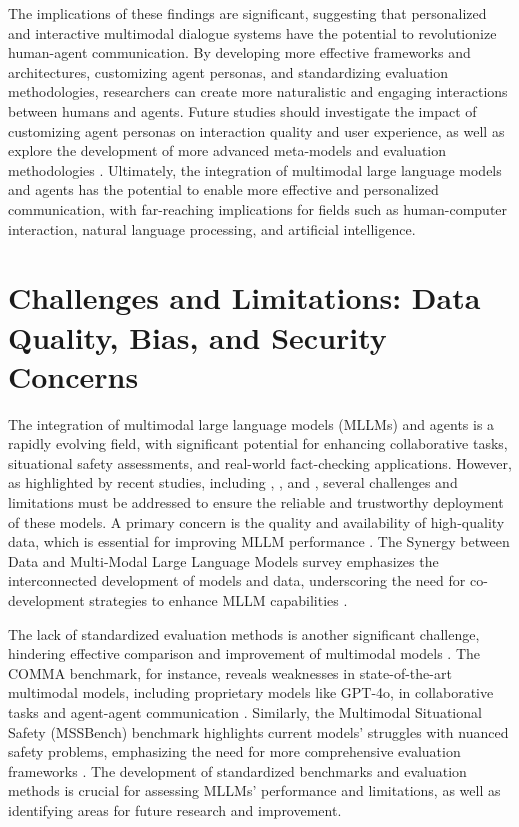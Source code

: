 \documentclass[conference]{IEEEtran}
\begin{document}
The implications of these findings are significant, suggesting that personalized and interactive multimodal dialogue systems have the potential to revolutionize human-agent communication. By developing more effective frameworks and architectures, customizing agent personas, and standardizing evaluation methodologies, researchers can create more naturalistic and engaging interactions between humans and agents. Future studies should investigate the impact of customizing agent personas on interaction quality and user experience, as well as explore the development of more advanced meta-models and evaluation methodologies \cite{b13}. Ultimately, the integration of multimodal large language models and agents has the potential to enable more effective and personalized communication, with far-reaching implications for fields such as human-computer interaction, natural language processing, and artificial intelligence.

\section{Challenges and Limitations: Data Quality, Bias, and Security Concerns}
The integration of multimodal large language models (MLLMs) and agents is a rapidly evolving field, with significant potential for enhancing collaborative tasks, situational safety assessments, and real-world fact-checking applications. However, as highlighted by recent studies, including \cite{b1}, \cite{b2}, and \cite{b3}, several challenges and limitations must be addressed to ensure the reliable and trustworthy deployment of these models. A primary concern is the quality and availability of high-quality data, which is essential for improving MLLM performance \cite{b4}. The Synergy between Data and Multi-Modal Large Language Models survey emphasizes the interconnected development of models and data, underscoring the need for co-development strategies to enhance MLLM capabilities \cite{b5}.

The lack of standardized evaluation methods is another significant challenge, hindering effective comparison and improvement of multimodal models \cite{b2}. The COMMA benchmark, for instance, reveals weaknesses in state-of-the-art multimodal models, including proprietary models like GPT-4o, in collaborative tasks and agent-agent communication \cite{b1}. Similarly, the Multimodal Situational Safety (MSSBench) benchmark highlights current models' struggles with nuanced safety problems, emphasizing the need for more comprehensive evaluation frameworks \cite{b3}. The development of standardized benchmarks and evaluation methods is crucial for assessing MLLMs' performance and limitations, as well as identifying areas for future research and improvement.
\end{document}
